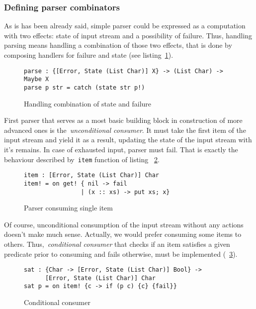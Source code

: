     \subsubsection{Defining parser combinators}

    As is has been already said, simple parser could be expressed as a computation
    with two effects: state of input stream and a possibility of failure. Thus,
    handling parsing means handling a combination of those two effects, that is done
    by composing handlers for failure and state (see
    listing~\ref{listing:parserHandlerCombo}).

    \begin{figure}[h]
    \begin{lstlisting}
parse : {[Error, State (List Char)] X} -> (List Char) -> Maybe X
parse p str = catch (state str p!)
    \end{lstlisting}
    \caption{Handling combination of state and failure}
    \label{listing:parserHandlerCombo}
    \end{figure}

    First parser that serves as a most basic building block in construction of
    more advanced ones is the~\emph{unconditional consumer}.
    It must take the first item
    of the input stream and yield it as a result, updating the state of the input
    stream with it's remains. In case of exhausted input, parser must fail. That
    is exactly the behaviour described by~\lstinline{item} function of listing
    ~\ref{listing:parserItemCombo}.

    \begin{figure}[h]
    \begin{lstlisting}
item : [Error, State (List Char)] Char
item! = on get! { nil -> fail
                | (x :: xs) -> put xs; x}
    \end{lstlisting}
    \caption{Parser consuming single item}
    \label{listing:parserItemCombo}
    \end{figure}

    Of course, unconditional consumption of the input stream without any actions
    doesn't make much sense. Actually, we would prefer consuming some items to others. Thus,~\emph{conditional consumer} that checks if an item satisfies a
    given predicate prior to consuming and fails otherwise, must be
    implemented (~\ref{listing:parserSatCombo}).

    \begin{figure}[h]
    \begin{lstlisting}
sat : {Char -> [Error, State (List Char)] Bool} ->
      [Error, State (List Char)] Char
sat p = on item! {c -> if (p c) {c} {fail}}
    \end{lstlisting}
    \caption{Conditional consumer}
    \label{listing:parserSatCombo}
    \end{figure}

